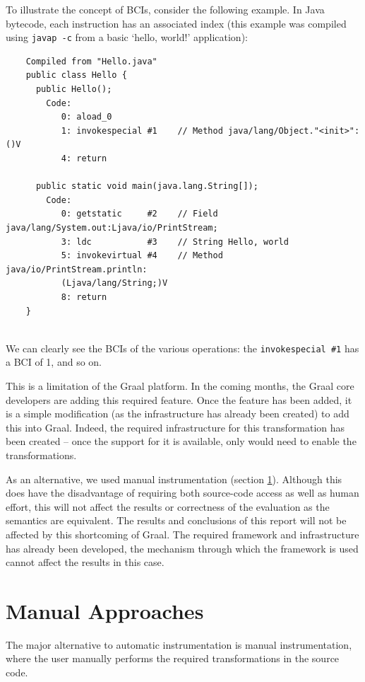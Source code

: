 	To illustrate the concept of BCIs, consider the following example. In Java bytecode, each instruction has an associated index (this example was compiled using \texttt{javap -c} from a basic `hello, world!' application):
	
	\begin{verbatim}
	Compiled from "Hello.java"
	public class Hello {
	  public Hello();
	    Code:
	       0: aload_0       
	       1: invokespecial #1    // Method java/lang/Object."<init>":()V
	       4: return        
	
	  public static void main(java.lang.String[]);
	    Code:
	       0: getstatic     #2    // Field java/lang/System.out:Ljava/io/PrintStream;
	       3: ldc           #3    // String Hello, world
	       5: invokevirtual #4    // Method java/io/PrintStream.println:
	       (Ljava/lang/String;)V
	       8: return        
	}
	
	\end{verbatim}
	
	We can clearly see the BCIs of the various operations: the \texttt{invokespecial \#1} has a BCI of 1, and so on.

	This is a limitation of the Graal platform. In the coming months, the Graal core developers are adding this required feature. Once the feature has been added, it is a simple modification (as the infrastructure has already been created) to add this into Graal. Indeed, the required infrastructure for this transformation has been created -- once the support for it is available, only would need to enable the transformations.
	
	As an alternative, we used manual instrumentation (section \ref{sec:instrumentation/manual}). Although this does have the disadvantage of requiring both source-code access as well as human effort, this will not affect the results or correctness of the evaluation as the semantics are equivalent. The results and conclusions of this report will not be affected by this shortcoming of Graal. The required framework and infrastructure has already been developed, the mechanism through which the framework is used cannot affect the results in this case.
	
\section{Manual Approaches} \label{sec:instrumentation/manual}
The major alternative to automatic instrumentation is manual instrumentation, where the user manually performs the required transformations in the source code.

